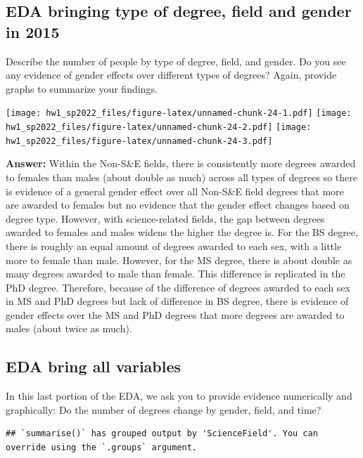 \documentclass[
]{article}
\begin{document}
\hypertarget{eda-bringing-type-of-degree-field-and-gender-in-2015}{%
\subsection{EDA bringing type of degree, field and gender in
2015}\label{eda-bringing-type-of-degree-field-and-gender-in-2015}}

Describe the number of people by type of degree, field, and gender. Do
you see any evidence of gender effects over different types of degrees?
Again, provide graphs to summarize your findings.

\texttt{[image: hw1\_sp2022\_files/figure-latex/unnamed-chunk-24-1.pdf]}
\texttt{[image: hw1\_sp2022\_files/figure-latex/unnamed-chunk-24-2.pdf]}
\texttt{[image: hw1\_sp2022\_files/figure-latex/unnamed-chunk-24-3.pdf]}

\textbf{Answer:} Within the Non-S\&E fields, there is consistently more
degrees awarded to females than males (about double as much) across all
types of degrees so there is evidence of a general gender effect over
all Non-S\&E field degrees that more are awarded to females but no
evidence that the gender effect changes based on degree type. However,
with science-related fields, the gap between degrees awarded to females
and males widens the higher the degree is. For the BS degree, there is
roughly an equal amount of degrees awarded to each sex, with a little
more to female than male. However, for the MS degree, there is about
double as many degrees awarded to male than female. This difference is
replicated in the PhD degree. Therefore, because of the difference of
degrees awarded to each sex in MS and PhD degrees but lack of difference
in BS degree, there is evidence of gender effects over the MS and PhD
degrees that more degrees are awarded to males (about twice as much).

\hypertarget{eda-bring-all-variables}{%
\subsection{EDA bring all variables}\label{eda-bring-all-variables}}

In this last portion of the EDA, we ask you to provide evidence
numerically and graphically: Do the number of degrees change by gender,
field, and time?

\begin{verbatim}
## `summarise()` has grouped output by 'ScienceField'. You can override using the `.groups` argument.
\end{verbatim}
\end{document}
